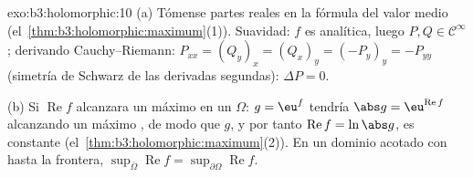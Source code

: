 \begin{solution}{exo:b3:holomorphic:10}
(a) Tómense partes reales en la fórmula del valor medio
(el~\cref{thm:b3:holomorphic:maximum}(1)). Suavidad: $f$ es analítica,
luego $P, Q \in \mathcal C^\infty$; derivando Cauchy--Riemann:
$P_{xx} = (Q_y)_x = (Q_x)_y = (-P_y)_y =
-P_{yy}$ (simetría de Schwarz de las derivadas segundas): $\Delta P =
0$.

(b) Si $\operatorname{Re}f$ alcanzara un máximo
 en un
 $\Omega$: $g = \eu^f$ tendría
$\abs g =
\eu^{\operatorname{Re}f}$ alcanzando un máximo
, de modo que $g$, y por
tanto $\operatorname{Re}f = \ln\abs g$, es constante
(el~\cref{thm:b3:holomorphic:maximum}(2)). En un dominio acotado con
 hasta la frontera,
$\sup_{\bar\Omega}\operatorname{Re}f =
\sup_{\partial\Omega}\operatorname{Re}f$.
\end{solution}

